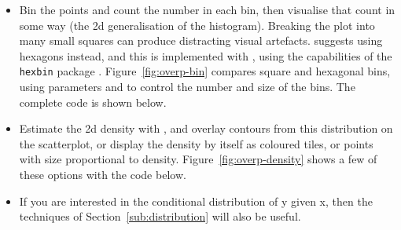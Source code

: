 \begin{itemize}
  \item Bin the points and count the number in each bin, then visualise that count in some way (the 2d generalisation of the histogram).  Breaking the plot into many small squares can produce distracting visual artefacts.  \citet{carr:1987} suggests using hexagons instead, and this is implemented with , using the capabilities of the {\tt hexbin} package \citep{hexbin}.  Figure~\ref{fig:overp-bin} compares square and hexagonal bins, using parameters  and  to control the number and size of the bins.  The complete code is shown below.
  
    
  
  \item Estimate the 2d density with , and overlay contours from this distribution on the scatterplot, or display the density by itself as coloured tiles, or points with size proportional to density.  Figure~\ref{fig:overp-density} shows a few of these options with the code below.
  
    
  
  \item If you are interested in the conditional distribution of y given x, then the techniques of Section~\ref{sub:distribution} will also be useful.
  
\end{itemize}

